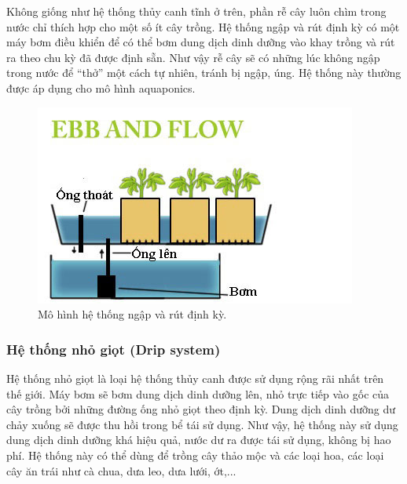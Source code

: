 \documentclass[a4paper,12pt,oneside]{article}
\begin{document}
\noindent Không giống như hệ thống thủy canh tĩnh ở trên, phần rễ cây luôn chìm trong nước chỉ thích hợp cho một số ít cây trồng. Hệ thống ngập và rút định kỳ có một máy bơm điều khiển để có thể bơm dung dịch dinh dưỡng vào khay trồng và rút ra theo chu kỳ đã được định sẵn. Như vậy rễ cây sẽ có những lúc không ngập trong nước để “thở” một cách tự nhiên, tránh bị ngập, úng. Hệ thống này thường được áp dụng cho mô hình aquaponics.\\
\begin{center}
\begin{figure}[htp]
\begin{center}
\includegraphics[scale=.9]{hinh/ebb_flow.jpg}
\end{center}
\caption{Mô hình hệ thống ngập và rút định kỳ.}

\end{figure}
\end{center}
\subsubsection{Hệ thống nhỏ giọt (Drip system)}
\noindent Hệ thống nhỏ giọt là loại hệ thống thủy canh được sử dụng rộng rãi nhất trên thế giới. Máy bơm sẽ bơm dung dịch dinh dưỡng lên, nhỏ trực tiếp vào gốc của cây trồng bởi những đường ống nhỏ giọt theo định kỳ. Dung dịch dinh dưỡng dư chảy xuống sẽ được thu hồi trong bể tái sử dụng. Như vậy, hệ thống này sử dụng dung dịch dinh dưỡng khá hiệu quả, nước dư ra được tái sử dụng, không bị hao phí. Hệ thống này có thể dùng để trồng cây thảo mộc và các loại hoa, các loại cây ăn trái như cà chua, dưa leo, dưa lưới, ớt,...\\
\end{document}
